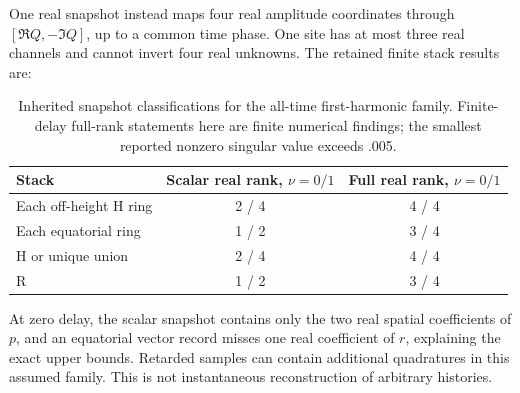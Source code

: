 One real snapshot instead maps four real amplitude coordinates through $[\Re Q,-\Im Q]$, up to a common time phase. One site has at most three real channels and cannot invert four real unknowns. The retained finite stack results are:
\begin{table}[htbp]\centering
\begin{tabular}{lcc}\toprule
Stack & Scalar real rank, $\nu=0/1$ & Full real rank, $\nu=0/1$\\\midrule
Each off-height H ring &2 / 4&4 / 4\\
Each equatorial ring &1 / 2&3 / 4\\
H or unique union &2 / 4&4 / 4\\
R &1 / 2&3 / 4\\\bottomrule
\end{tabular}
\caption{Inherited snapshot classifications for the all-time first-harmonic family. Finite-delay full-rank statements here are finite numerical findings; the smallest reported nonzero singular value exceeds .005.}\label{tab:snapshots}
\end{table}
At zero delay, the scalar snapshot contains only the two real spatial coefficients of $p$, and an equatorial vector record misses one real coefficient of $r$, explaining the exact upper bounds. Retarded samples can contain additional quadratures in this assumed family. This is not instantaneous reconstruction of arbitrary histories.

